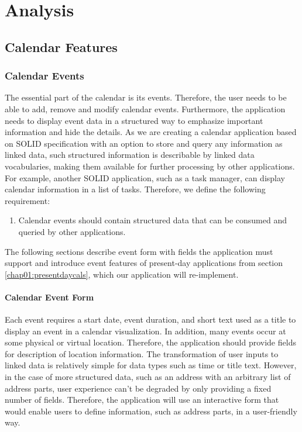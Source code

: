 \chapter{Analysis}

\section{Calendar Features}

\subsection*{Calendar Events}

The essential part of the calendar is its events. Therefore, the user needs to be able to add, remove and modify calendar events. Furthermore, the application needs to display event data in a structured way to emphasize important information and hide the details. As we are creating a calendar application based on SOLID specification with an option to store and query any information as linked data, such structured information is describable by linked data vocabularies, making them available for further processing by other applications. For example, another SOLID application, such as a task manager, can display calendar information in a list of tasks. Therefore, we define the following requirement:

\begin{enumerate}[label=\color{reqcolor}\textbf{R{\arabic*}}]
    \item \label{app:req:events1} Calendar events should contain structured data that can be consumed and queried by other applications.
\end{enumerate}

The following sections describe event form with fields the application must support and introduce event features of present-day applications from section \ref{chap01:presentdaycals}, which our application will re-implement.

\subsubsection*{Calendar Event Form}

Each event requires a start date, event duration, and short text used as a title to display an event in a calendar visualization. In addition, many events occur at some physical or virtual location. Therefore, the application should provide fields for description of location information. The transformation of user inputs to linked data is relatively simple for data types such as time or title text. However, in the case of more structured data, such as an address with an arbitrary list of address parts, user experience can't be degraded by only providing a fixed number of fields. Therefore, the application will use an interactive form that would enable users to define information, such as address parts, in a user-friendly way.

